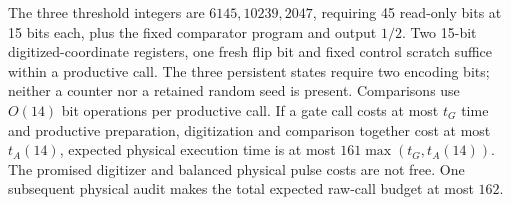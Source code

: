 The three threshold integers are $6145,10239,2047$, requiring 45 read-only bits at 15 bits each, plus the fixed comparator program and output $1/2$. Two 15-bit digitized-coordinate registers, one fresh flip bit and fixed control scratch suffice within a productive call. The three persistent states require two encoding bits; neither a counter nor a retained random seed is present. Comparisons use $O(14)$ bit operations per productive call. If a gate call costs at most $t_G$ time and productive preparation, digitization and comparison together cost at most $t_A(14)$, expected physical execution time is at most $161\max(t_G,t_A(14))$. The promised digitizer and balanced physical pulse costs are not free. One subsequent physical audit makes the total expected raw-call budget at most $162$.
